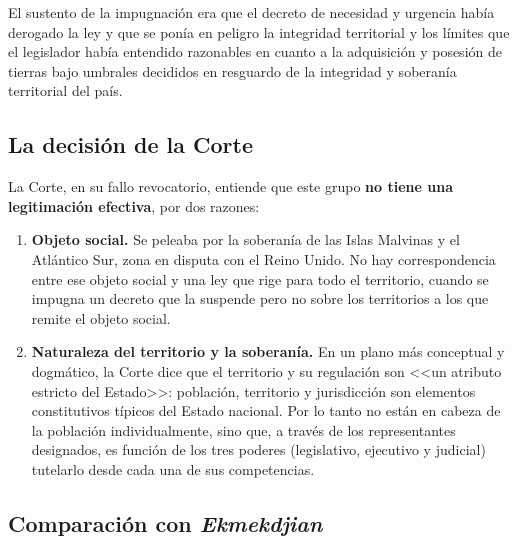 \documentclass[12pt,oneside]{book}
\begin{document}
El sustento de la impugnación era que el decreto de necesidad y urgencia había derogado la ley y que se ponía en peligro la integridad territorial y los límites que el legislador había entendido razonables en cuanto a la adquisición y posesión de tierras bajo umbrales decididos en resguardo de la integridad y soberanía territorial del país.


\subsection{La decisión de la Corte}

La Corte, en su fallo revocatorio, entiende que este grupo \textbf{no tiene una legitimación efectiva}, por dos razones:

\begin{enumerate}
    \item \textbf{Objeto social.} Se peleaba por la soberanía de las Islas Malvinas y el Atlántico Sur, zona en disputa con el Reino Unido. No hay correspondencia entre ese objeto social y una ley que rige para todo el territorio, cuando se impugna un decreto que la suspende pero no sobre los territorios a los que remite el objeto social.
    \item \textbf{Naturaleza del territorio y la soberanía.} En un plano más conceptual y dogmático, la Corte dice que el territorio y su regulación son <<un atributo estricto del Estado>>: población, territorio y jurisdicción son elementos constitutivos típicos del Estado nacional. Por lo tanto no están en cabeza de la población individualmente, sino que, a través de los representantes designados, es función de los tres poderes (legislativo, ejecutivo y judicial) tutelarlo desde cada una de sus competencias.
\end{enumerate}

\subsection{Comparación con \textit{Ekmekdjian}}
\end{document}
